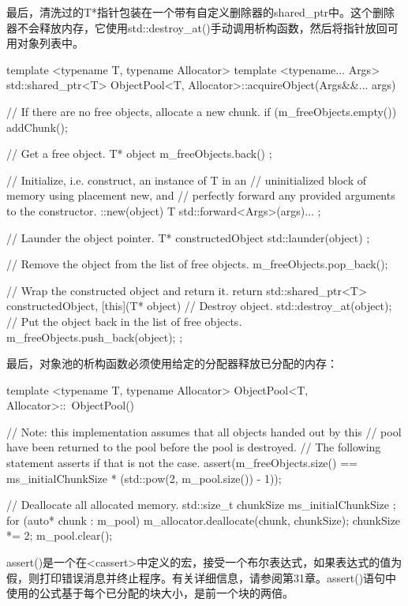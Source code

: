 最后，清洗过的T*指针包装在一个带有自定义删除器的shared\_ptr中。这个删除器不会释放内存，它使用std::destroy\_at()手动调用析构函数，然后将指针放回可用对象列表中。

\begin{cpp}
template <typename T, typename Allocator>
template <typename... Args>
std::shared_ptr<T> ObjectPool<T, Allocator>::acquireObject(Args&&... args)
{
    // If there are no free objects, allocate a new chunk.
    if (m_freeObjects.empty()) { addChunk(); }

    // Get a free object.
    T* object { m_freeObjects.back() };

    // Initialize, i.e. construct, an instance of T in an
    // uninitialized block of memory using placement new, and
    // perfectly forward any provided arguments to the constructor.
    ::new(object) T { std::forward<Args>(args)... };

    // Launder the object pointer.
    T* constructedObject { std::launder(object) };

    // Remove the object from the list of free objects.
    m_freeObjects.pop_back();

    // Wrap the constructed object and return it.
    return std::shared_ptr<T> { constructedObject, [this](T* object) {
        // Destroy object.
        std::destroy_at(object);
        // Put the object back in the list of free objects.
        m_freeObjects.push_back(object);
    } };
}
\end{cpp}

最后，对象池的析构函数必须使用给定的分配器释放已分配的内存：

\begin{cpp}
template <typename T, typename Allocator>
ObjectPool<T, Allocator>::~ObjectPool()
{
    // Note: this implementation assumes that all objects handed out by this
    //       pool have been returned to the pool before the pool is destroyed.
    //       The following statement asserts if that is not the case.
    assert(m_freeObjects.size() ==
        ms_initialChunkSize * (std::pow(2, m_pool.size()) - 1));

    // Deallocate all allocated memory.
    std::size_t chunkSize { ms_initialChunkSize };
    for (auto* chunk : m_pool) {
        m_allocator.deallocate(chunk, chunkSize);
        chunkSize *= 2;
    }
    m_pool.clear();
}
\end{cpp}

assert()是一个在<cassert>中定义的宏，接受一个布尔表达式，如果表达式的值为假，则打印错误消息并终止程序。有关详细信息，请参阅第31章。assert()语句中使用的公式基于每个已分配的块大小，是前一个块的两倍。

